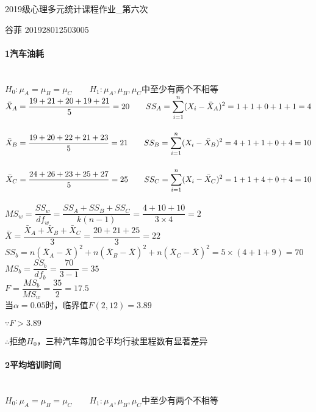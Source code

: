\documentclass[UTF8]{ctexart}
\begin{document}
\begin{center}
	\LARGE
	2019级心理多元统计课程作业\_第六次

	\normalsize
	谷菲 201928012503005
\end{center}

\paragraph{1汽车油耗}
~\\

$H_0:\mu_A=\mu_B=\mu_C \qquad H_1:\mu_A,\mu_B,\mu_C$中至少有两个不相等
~\\

$\bar{X}_A=\dfrac{19+21+20+19+21}{5}=20 \qquad SS_A=\displaystyle \sum_{i=1}^n (X_i-\Bar{X}_A)^2=1+1+0+1+1=4$
~\\

$\bar{X}_B=\dfrac{19+20+22+21+23}{5}=21 \qquad SS_B=\displaystyle \sum_{i=1}^n (X_i-\Bar{X}_B)^2=4+1+1+0+4=10$
~\\

$\bar{X}_C=\dfrac{24+26+23+25+27}{5}=25 \qquad SS_C=\displaystyle \sum_{i=1}^n (X_i-\Bar{X}_C)^2=1+1+4+0+4=10$
~\\

$MS_w=\dfrac{SS_w}{df_w}=\dfrac{SS_A+SS_B+SS_C}{k(n-1)}=\dfrac{4+10+10}{3\times 4}=2$
~\\

$\bar{X}=\dfrac{\bar{X}_A+\bar{X}_B+\bar{X}_C}{3}=\dfrac{20+21+25}{3}=22$
~\\
 
$SS_b=n(\bar{X}_A-\bar{X})^2+n(\bar{X}_B-\bar{X})^2+n(\bar{X}_C-\bar{X})^2=5\times(4+1+9)=70$
~\\

$MS_b=\dfrac{SS_b}{df_b}=\dfrac{70}{3-1}=35$
~\\

$F=\dfrac{MS_b}{MS_w}=\dfrac{35}{2}=17.5$
~\\

当$\alpha=0.05$时，临界值$F(2,12)=3.89$

$\because F > 3.89$

$\therefore$拒绝$H_0$，三种汽车每加仑平均行驶里程数有显著差异

\paragraph{2平均培训时间}
~\\

$H_0:\mu_A=\mu_B=\mu_C \qquad H_1:\mu_A,\mu_B,\mu_C$中至少有两个不相等
~\\
\end{document}
